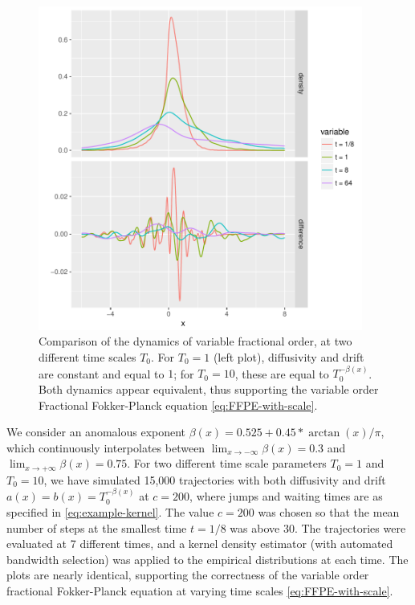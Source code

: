 \documentclass[a4paper,12pt]{article}
\numberwithin{equation}{section}
\theoremstyle{plain}
\theoremstyle{definition}
\theoremstyle{remark}
\numberwithin{equation}{section}
\newcommand{\1}{\mathbf 1}
\begin{document}
\begin{figure}
\includegraphics[width = 0.95\textwidth]{densities.pdf}
\caption{Comparison of the dynamics of variable fractional order, at two different time scales $T_0$. For $T_0 = 1$ (left plot), diffusivity and drift are constant and equal to $1$; for $T_0 = 10$, these are equal to $T_0^{-\beta(x)}$. Both dynamics appear equivalent, thus supporting the variable order Fractional Fokker-Planck equation \eqref{eq:FFPE-with-scale}.}
\end{figure}

We consider an anomalous exponent $\beta(x) = 0.525 + 0.45 * \arctan(x)/ \pi$, which continuously interpolates between $\lim_{x \to -\infty} \beta(x) = 0.3$ 
and $\lim_{x \to +\infty} \beta(x) = 0.75$.
For two different time scale parameters $T_0 = 1$ and $T_0 = 10$, we have simulated 15,000 trajectories with both diffusivity and drift $a(x) = b(x) = T_0^{-\beta(x)}$
at $c = 200$, where jumps and waiting times are as specified in \eqref{eq:example-kernel}. The value $c = 200$ was chosen so that the mean number of steps at the smallest time $t = 1/8$ was above $30$. The trajectories were evaluated at 7 different times, and a kernel density estimator (with automated bandwidth selection) was applied
to the empirical distributions at each time.  The plots are nearly identical, supporting the correctness of the variable order fractional Fokker-Planck equation at varying time scales \eqref{eq:FFPE-with-scale}. 
\end{document}
